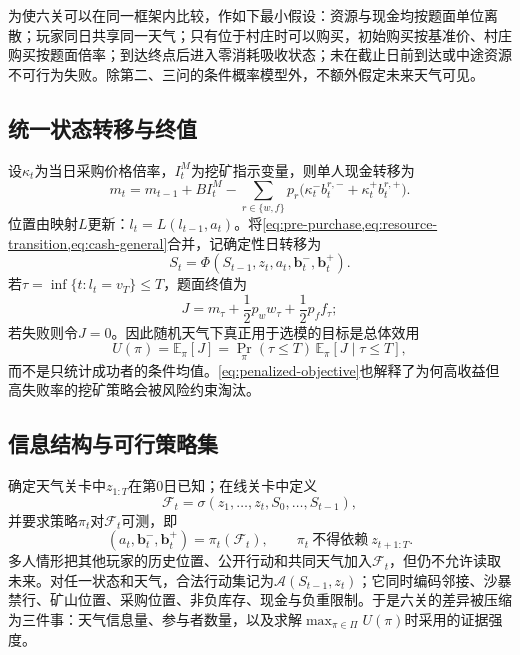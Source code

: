 为使六关可以在同一框架内比较，作如下最小假设：资源与现金均按题面单位离散；玩家同日共享同一天气；只有位于村庄时可以购买，初始购买按基准价、村庄购买按题面倍率；到达终点后进入零消耗吸收状态；未在截止日前到达或中途资源不可行为失败。除第二、三问的条件概率模型外，不额外假定未来天气可见。

\subsection{统一状态转移与终值}

设$\kappa_t$为当日采购价格倍率，$I_t^M$为挖矿指示变量，则单人现金转移为
\begin{equation}
m_t=m_{t-1}+BI_t^M-
\sum_{r\in\{w,f\}}p_r\bigl(\kappa_t^-b_t^{r,-}+\kappa_t^+b_t^{r,+}\bigr).
\label{eq:cash-general}
\end{equation}
位置由映射$L$更新：$l_t=L(l_{t-1},a_t)$。将\cref{eq:pre-purchase,eq:resource-transition,eq:cash-general}合并，记确定性日转移为
\begin{equation}
S_t=\Phi(S_{t-1},z_t,a_t,\bm b_t^-,\bm b_t^+).
\label{eq:unified-transition}
\end{equation}
若$\tau=\inf\{t:l_t=v_T\}\le T$，题面终值为
\begin{equation}
J=m_\tau+\frac12p_ww_\tau+\frac12p_ff_\tau;
\label{eq:terminal}
\end{equation}
若失败则令$J=0$。因此随机天气下真正用于选模的目标是总体效用
\begin{equation}
U(\pi)=\mathbb E_\pi[J]
=\Pr_\pi(\tau\le T)\,\mathbb E_\pi[J\mid \tau\le T],
\label{eq:penalized-objective}
\end{equation}
而不是只统计成功者的条件均值。\cref{eq:penalized-objective}也解释了为何高收益但高失败率的挖矿策略会被风险约束淘汰。

\subsection{信息结构与可行策略集}

确定天气关卡中$z_{1:T}$在第0日已知；在线关卡中定义
\begin{equation}
\mathcal F_t=\sigma(z_1,\ldots,z_t,S_0,\ldots,S_{t-1}),
\end{equation}
并要求策略$\pi_t$对$\mathcal F_t$可测，即
\begin{equation}
(a_t,\bm b_t^-,\bm b_t^+)=\pi_t(\mathcal F_t),
\qquad
\pi_t\ \text{不得依赖}\ z_{t+1:T}.
\label{eq:nonanticipativity}
\end{equation}
多人情形把其他玩家的历史位置、公开行动和共同天气加入$\mathcal F_t$，但仍不允许读取未来。对任一状态和天气，合法行动集记为$\mathcal A(S_{t-1},z_t)$；它同时编码邻接、沙暴禁行、矿山位置、采购位置、非负库存、现金与负重限制。于是六关的差异被压缩为三件事：天气信息量、参与者数量，以及求解$\max_{\pi\in\Pi}U(\pi)$时采用的证据强度。

